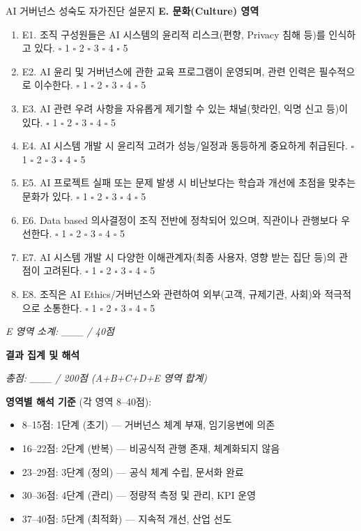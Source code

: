 \begin{practicaltool}{AI 거버넌스 성숙도 자가진단 설문지}
\textbf{E. 문화(Culture) 영역}
\begin{enumerate}
 \item E1. 조직 구성원들은 AI 시스템의 윤리적 리스크(편향, Privacy 침해 등)를 인식하고 있다. \hfill $\square$ 1 $\square$ 2 $\square$ 3 $\square$ 4 $\square$ 5
 \item E2. AI 윤리 및 거버넌스에 관한 교육 프로그램이 운영되며, 관련 인력은 필수적으로 이수한다. \hfill $\square$ 1 $\square$ 2 $\square$ 3 $\square$ 4 $\square$ 5
 \item E3. AI 관련 우려 사항을 자유롭게 제기할 수 있는 채널(핫라인, 익명 신고 등)이 있다. \hfill $\square$ 1 $\square$ 2 $\square$ 3 $\square$ 4 $\square$ 5
 \item E4. AI 시스템 개발 시 윤리적 고려가 성능/일정과 동등하게 중요하게 취급된다. \hfill $\square$ 1 $\square$ 2 $\square$ 3 $\square$ 4 $\square$ 5
 \item E5. AI 프로젝트 실패 또는 문제 발생 시 비난보다는 학습과 개선에 초점을 맞추는 문화가 있다. \hfill $\square$ 1 $\square$ 2 $\square$ 3 $\square$ 4 $\square$ 5
 \item E6. Data based 의사결정이 조직 전반에 정착되어 있으며, 직관이나 관행보다 우선한다. \hfill $\square$ 1 $\square$ 2 $\square$ 3 $\square$ 4 $\square$ 5
 \item E7. AI 시스템 개발 시 다양한 이해관계자(최종 사용자, 영향 받는 집단 등)의 관점이 고려된다. \hfill $\square$ 1 $\square$ 2 $\square$ 3 $\square$ 4 $\square$ 5
 \item E8. 조직은 AI Ethics/거버넌스와 관련하여 외부(고객, 규제기관, 사회)와 적극적으로 소통한다. \hfill $\square$ 1 $\square$ 2 $\square$ 3 $\square$ 4 $\square$ 5
\end{enumerate}
\textit{E 영역 소계: \_\_\_ / 40점}

\textbf{결과 집계 및 해석}

\textit{총점: \_\_\_ / 200점 (A+B+C+D+E 영역 합계)}

\textbf{영역별 해석 기준} (각 영역 8--40점):
\begin{itemize}
 \item 8--15점: 1단계 (초기) --- 거버넌스 체계 부재, 임기응변에 의존
 \item 16--22점: 2단계 (반복) --- 비공식적 관행 존재, 체계화되지 않음
 \item 23--29점: 3단계 (정의) --- 공식 체계 수립, 문서화 완료
 \item 30--36점: 4단계 (관리) --- 정량적 측정 및 관리, KPI 운영
 \item 37--40점: 5단계 (최적화) --- 지속적 개선, 산업 선도
\end{itemize}


\end{practicaltool}
